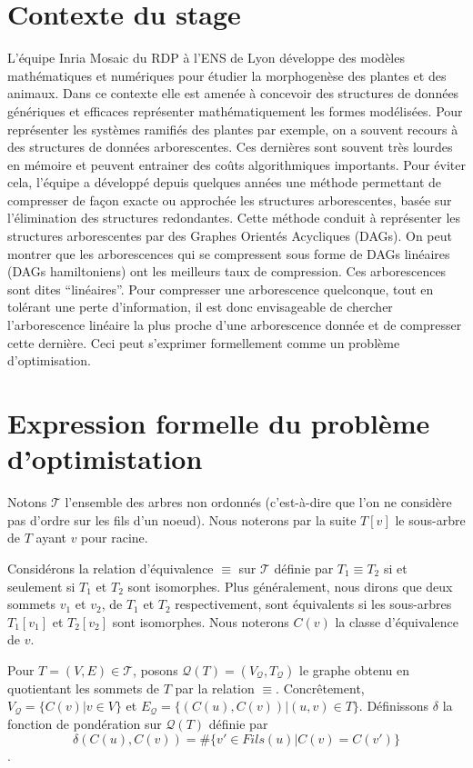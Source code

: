 \section*{Contexte du stage}
L’équipe Inria Mosaic du RDP à l’ENS de Lyon développe des modèles
mathématiques et numériques pour étudier la morphogenèse des plantes
et des animaux. Dans ce contexte elle est amenée à concevoir des
structures de données génériques et efficaces représenter
mathématiquement les formes modélisées. Pour représenter les systèmes
ramifiés des plantes par exemple, on a souvent recours à des
structures de données arborescentes. Ces dernières sont souvent très
lourdes en mémoire et peuvent entrainer des coûts algorithmiques
importants. Pour éviter cela, l’équipe a développé depuis quelques
années une méthode permettant de compresser de façon exacte ou
approchée les structures arborescentes, basée sur l’élimination des
structures redondantes. Cette méthode conduit à représenter les
structures arborescentes par des Graphes Orientés Acycliques (DAGs). On
peut montrer que les arborescences qui se compressent sous forme de
DAGs linéaires (DAGs hamiltoniens) ont les meilleurs taux de
compression. Ces arborescences sont dites “linéaires”.  Pour
compresser une arborescence quelconque, tout en tolérant une perte
d’information, il est donc envisageable de chercher l’arborescence
linéaire la plus proche d’une arborescence donnée et de compresser
cette dernière. Ceci peut s’exprimer formellement comme un problème
d’optimisation.

\section*{Expression formelle du problème d'optimistation}
Notons $\mathcal{T}$ l'ensemble des arbres non ordonnés (c'est-à-dire
que l'on ne considère pas d'ordre sur les fils d'un noeud).
Nous noterons par la suite $T[v]$ le sous-arbre de $T$ ayant $v$ pour racine.

Considérons la relation d'équivalence $\equiv$ sur $\mathcal{T}$
définie par $T_1 \equiv T_2$ si et seulement si $T_1$ et $T_2$ sont
isomorphes. Plus généralement, nous dirons que deux sommets $v_1$ et
$v_2$, de $T_1$ et $T_2$ respectivement, sont équivalents si les
sous-arbres $T_1[v_1]$ et $T_2[v_2]$ sont isomorphes. Nous noterons
$C(v)$ la classe d'équivalence de $v$.

Pour $T = (V,E) \in \mathcal{T}$, posons
$\mathcal{Q}(T) = (V_{\mathcal{Q}}, T_{\mathcal{Q}})$ le graphe obtenu
en quotientant les sommets de $T$ par la relation
$\equiv$. Concrêtement, $V_{\mathcal{Q}} = \{ C(v) | v \in V \}$ et
$E_{\mathcal{Q}} = \{ (C(u), C(v)) | (u,v) \in T \}$. Définissons
$\delta$ la fonction de pondération sur $\mathcal{Q}(T)$ définie par
$$\delta(C(u), C(v)) = \#\{ v' \in Fils(u) | C(v) = C(v')\}$$.

